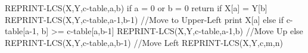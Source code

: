 REPRINT-LCS(X,Y,c-table,a,b)
	if a = 0 or b = 0
		return
	if X[a] = Y[b]
		REPRINT-LCS(X,Y,c-table,a-1,b-1)     //Move to Upper-Left
		print X[a]
	else if c-table[a-1, b] >= c-table[a,b-1]
		REPRINT-LCS(X,Y,c-table,a-1,b) 	  //Move Up
	else
		REPRINT-LCS(X,Y,c-table,a,b-1)	  //Move Left
REPRINT-LCS(X,Y,c,m,n)